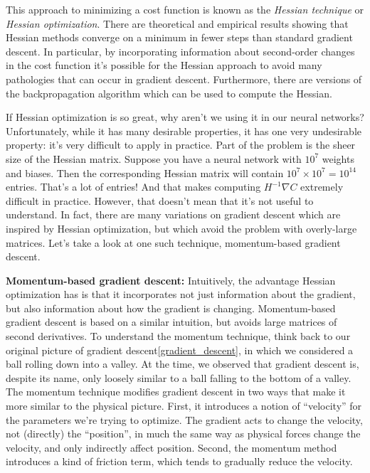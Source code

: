 \documentclass[a4paper,twoside,10pt]{book}
\begin{document}
This approach to minimizing a cost function is known as the \textit{Hessian technique} or \textit{Hessian optimization}. There are theoretical and empirical results showing that Hessian methods converge on a minimum in fewer steps than standard gradient descent. In particular, by incorporating information about second-order changes in the cost function it's possible for the Hessian approach to avoid many pathologies that can occur in gradient descent. Furthermore, there are versions of the backpropagation algorithm which can be used to compute the Hessian.

If Hessian optimization is so great, why aren't we using it in our neural networks? Unfortunately, while it has many desirable properties, it has one very undesirable property: it's very difficult to apply in practice. Part of the problem is the sheer size of the Hessian matrix. Suppose you have a neural network with $10^7$ weights and biases. Then the corresponding Hessian matrix will contain $10^7\times10^7=10^{14}$ entries. That's a lot of entries! And that makes computing $H^{-1} \nabla C$ extremely difficult in practice. However, that doesn't mean that it's not useful to understand. In fact, there are many variations on gradient descent which are inspired by Hessian optimization, but which avoid the problem with overly-large matrices. Let's take a look at one such technique, momentum-based gradient descent.


\textbf{Momentum-based gradient descent:} Intuitively, the advantage Hessian optimization has is that it incorporates not just information about the gradient, but also information about how the gradient is changing. Momentum-based gradient descent is based on a similar intuition, but avoids large matrices of second derivatives. To understand the momentum technique, think back to our original picture of gradient descent\ref{gradient_descent}, in which we considered a ball rolling down into a valley. At the time, we observed that gradient descent is, despite its name, only loosely similar to a ball falling to the bottom of a valley. The momentum technique modifies gradient descent in two ways that make it more similar to the physical picture. First, it introduces a notion of ``velocity'' for the parameters we're trying to optimize. The gradient acts to change the velocity, not (directly) the ``position'', in much the same way as physical forces change the velocity, and only indirectly affect position. Second, the momentum method introduces a kind of friction term, which tends to gradually reduce the velocity.
\end{document}
